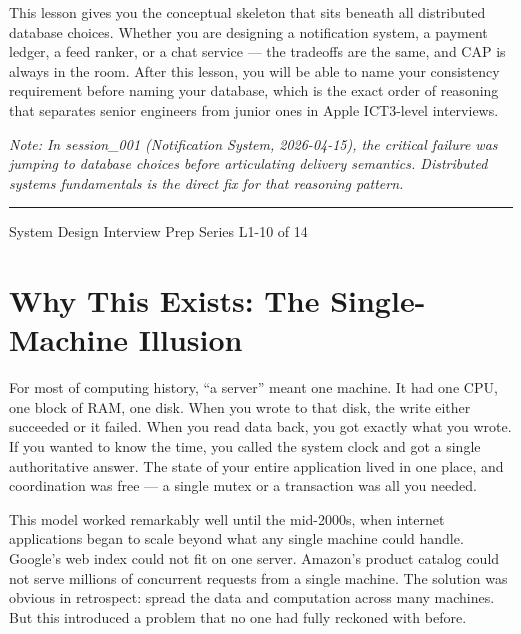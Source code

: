 \documentclass[11pt,a4paper]{article}
\begin{document}
\begin{titlepage}
\begin{insightbox}
This lesson gives you the conceptual skeleton that sits beneath all distributed database choices. Whether you are designing a notification system, a payment ledger, a feed ranker, or a chat service --- the tradeoffs are the same, and CAP is always in the room. After this lesson, you will be able to name your consistency requirement before naming your database, which is the exact order of reasoning that separates senior engineers from junior ones in Apple ICT3-level interviews.

\textit{Note: In session\_001 (Notification System, 2026-04-15), the critical failure was jumping to database choices before articulating delivery semantics. Distributed systems fundamentals is the direct fix for that reasoning pattern.}
\end{insightbox}

\vfill
{\color{highlight!60}\rule{\linewidth}{0.6pt}}
{\small\color{primary!50} System Design Interview Prep Series \hfill L1-10 of 14}

\restoregeometry
\end{titlepage}

\newpage
\tableofcontents
\newpage

\section{Why This Exists: The Single-Machine Illusion}

For most of computing history, ``a server'' meant one machine. It had one CPU, one block of RAM, one disk. When you wrote to that disk, the write either succeeded or it failed. When you read data back, you got exactly what you wrote. If you wanted to know the time, you called the system clock and got a single authoritative answer. The state of your entire application lived in one place, and coordination was free --- a single mutex or a transaction was all you needed.

This model worked remarkably well until the mid-2000s, when internet applications began to scale beyond what any single machine could handle. Google's web index could not fit on one server. Amazon's product catalog could not serve millions of concurrent requests from a single machine. The solution was obvious in retrospect: spread the data and computation across many machines. But this introduced a problem that no one had fully reckoned with before.
\end{document}
